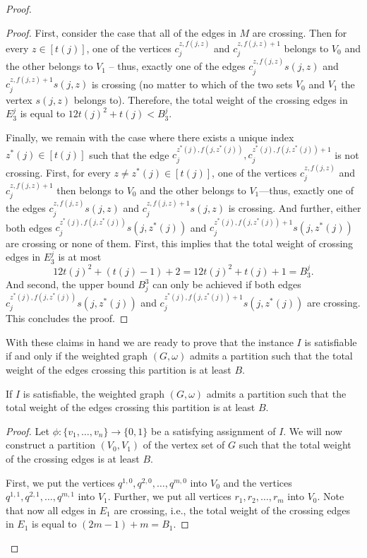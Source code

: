\documentclass[a4paper,UKenglish,cleveref, autoref, thm-restate]{lipics-v2021}
\begin{document}
\begin{proof}
\begin{proof}
        First, consider the case that all of the edges in $M$ are crossing.
        Then for every $z \in [t(j)]$, one of the vertices $c_j^{z, f(j,z)}$ and $c_j^{z, f(j,z)+1}$ belongs to $V_0$ and the other belongs to $V_1$ -- thus, exactly one of the edges $c_j^{z, f(j,z)} s(j,z)$ and $c_j^{z, f(j,z)+1} s(j,z)$ is crossing (no matter to which of the two sets $V_0$ and $V_1$ the vertex $s(j,z)$ belongs to).
        Therefore, the total weight of the crossing edges in $E^j_3$ is equal to $12t(j)^2 + t(j) < B^j_3$.

        Finally, we remain with the case where there exists a unique index $z^*(j) \in [t(j)]$ such that the edge $c_j^{z^*(j), f(j,z^*(j))}, c_j^{z^*(j), f(j,z^*(j))+1}$ is not crossing.
        First, for every $z \neq z^*(j) \in [t(j)]$, one of the vertices $c_j^{z, f(j,z)}$ and $c_j^{z, f(j,z)+1}$ then belongs to $V_0$ and the other belongs to $V_1$---thus, exactly one of the edges $c_j^{z, f(j,z)} s(j,z)$ and $c_j^{z, f(j,z)+1} s(j,z)$ is crossing.
        And further, either both edges $c_j^{z^*(j), f(j,z^*(j))} s(j,z^*(j))$ and $c_j^{z^*(j), f(j,z^*(j))+1} s(j,z^*(j))$ are crossing or none of them.
        First, this implies that the total weight of crossing edges in $E^j_3$ is at most
        \[
              12t(j)^2 + (t(j) - 1) + 2 = 12t(j)^2 + t(j) + 1 = B^j_3.
        \]
        And second, the upper bound $B_j^3$ can only be achieved if both edges $c_j^{z^*(j), f(j,z^*(j))} s(j,z^*(j))$ and $c_j^{z^*(j), f(j,z^*(j))+1} s(j,z^*(j))$ are crossing.
        This concludes the proof.
    \end{proof}

    With these claims in hand we are ready to prove that the instance $I$ is satisfiable if and only if the weighted graph $(G, \omega)$ admits a partition such that the total weight of the edges crossing this partition is at least $B$.

    \begin{claim}
        If $I$ is satisfiable, the weighted graph $(G, \omega)$ admits a partition such that the total weight of the edges crossing this partition is at least $B$.
    \end{claim}
    \begin{proof}
        Let $\phi \colon \{v_1, \dots, v_n\} \to \{0, 1\}$ be a satisfying assignment of $I$.
        We will now construct a partition $(V_0, V_1)$ of the vertex set of $G$ such that the total weight of the crossing edges is at least $B$.

        First, we put the vertices $q^{1,0}, q^{2,0}, \dots, q^{m,0}$ into $V_0$ and the vertices $q^{1,1}, q^{2,1}, \dots, q^{m,1}$ into $V_1$.
        Further, we put all vertices $r_1, r_2, \dots, r_m$ into $V_0$.
        Note that now all edges in $E_1$ are crossing, i.e., the total weight of the crossing edges in $E_1$ is equal to $(2m-1) + m = B_1$.


\end{proof}
\end{proof}
\end{document}
